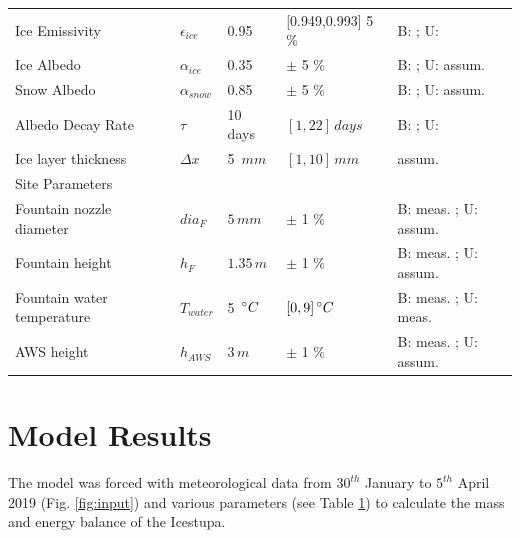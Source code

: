 \documentclass[utf8]{frontiersSCNS} %
\begin{document}
\begin{table}[p]
\begin{tabularx}{\linewidth}{ X l X l X  }
        Ice Emissivity        & $\epsilon_{ice}$ & 0.95 & [0.949,0.993] 5 \% & B: \citeauthor{CuffeyPaterson_2010}; U:
        \citeauthor{HORI2006486}\\
        Ice Albedo         & $\alpha_{ice}$ & 0.35 & $\pm$ 5 \%  & B: \citeauthor{CuffeyPaterson_2010}; U: assum.   \\
        
        Snow Albedo        & $\alpha_{snow}$ & 0.85 & $\pm$ 5 \% & B: \citeauthor{CuffeyPaterson_2010}; U: assum.  \\
        Albedo Decay Rate & $\tau$ & 10 days & $[1,22]\, days$ & B: \citeauthor{Schmidt_2017}; U:
        \citeauthor{OerlemansKnap_1998}  \\ Ice layer thickness & $\Delta x$ & 5 $\,mm$ & $[1,10]\, mm$   & assum.\\
        
        \hline Site Parameters& & & & \\ \hline Fountain nozzle diameter & $dia_{F}$ & $5 \,mm$ & $\pm$ 1 $\%$   & B:
        meas. ; U: assum.\\ Fountain height & $h_{F}$ & $1.35 \,m$ &  $\pm$ 1 $\%$   & B: meas. ; U: assum.\\ Fountain
        water temperature & $T_{water}$ & 5 $\,\degree C$ & $[0,9] \,\degree C$   & B: meas. ; U: meas.\\ AWS height &
        $h_{AWS}$ & $3 \,m$ & $\pm$ 1 $\%$   & B: meas. ; U: assum.\\
        
        \hline \end{tabularx} \label{table:parameters} \end{table} \clearpage


\section{Model Results} 
The model was forced with meteorological data from $30^{th}$ January to $5^{th}$ April 2019 (Fig.
\ref{fig:input}) and various parameters (see Table \ref{table:parameters}) to calculate the mass and energy balance of
the Icestupa.
\end{document}
